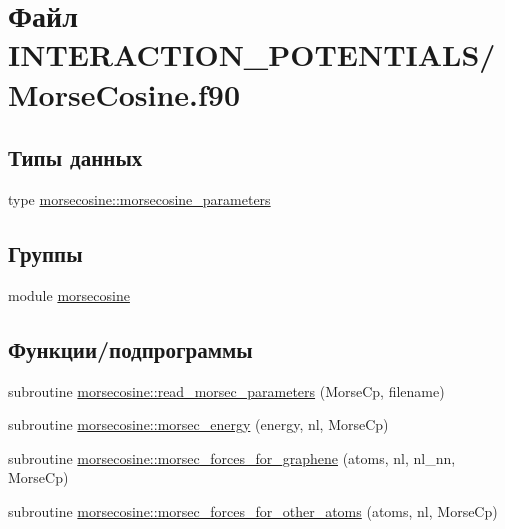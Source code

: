 \hypertarget{_morse_cosine_8f90}{}\section{Файл I\+N\+T\+E\+R\+A\+C\+T\+I\+O\+N\+\_\+\+P\+O\+T\+E\+N\+T\+I\+A\+L\+S/\+Morse\+Cosine.f90}
\label{_morse_cosine_8f90}
\subsection*{Типы данных}
\begin{DoxyCompactItemize}
\item 
type \mbox{\hyperlink{structmorsecosine_1_1morsecosine__parameters}{morsecosine\+::morsecosine\+\_\+parameters}}
\end{DoxyCompactItemize}
\subsection*{Группы}
\begin{DoxyCompactItemize}
\item 
module \mbox{\hyperlink{namespacemorsecosine}{morsecosine}}
\end{DoxyCompactItemize}
\subsection*{Функции/подпрограммы}
\begin{DoxyCompactItemize}
\item 
subroutine \mbox{\hyperlink{namespacemorsecosine_a2d4790950d9c660d18edf6f5dace6031}{morsecosine\+::read\+\_\+morsec\+\_\+parameters}} (Morse\+Cp, filename)
\item 
subroutine \mbox{\hyperlink{namespacemorsecosine_ab16ff8dd21fbf36d2c97a3905d47702b}{morsecosine\+::morsec\+\_\+energy}} (energy, nl, Morse\+Cp)
\item 
subroutine \mbox{\hyperlink{namespacemorsecosine_ab762564d1cafd5251e7aac73fbd757db}{morsecosine\+::morsec\+\_\+forces\+\_\+for\+\_\+graphene}} (atoms, nl, nl\+\_\+nn, Morse\+Cp)
\item 
subroutine \mbox{\hyperlink{namespacemorsecosine_afcca4f80b6e7596c0d7ed68b7346da99}{morsecosine\+::morsec\+\_\+forces\+\_\+for\+\_\+other\+\_\+atoms}} (atoms, nl, Morse\+Cp)
\end{DoxyCompactItemize}
